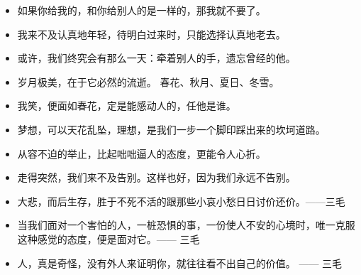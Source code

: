 \documentclass[UTF8,a4paper,8pt]{ctexbook}
\begin{document}
\begin{itemize}
				\item 如果你给我的，和你给别人的是一样的，那我就不要了。
				
				\item 我来不及认真地年轻，待明白过来时，只能选择认真地老去。
				
				\item 或许，我们终究会有那么一天：牵着别人的手，遗忘曾经的他。
				
				\item 岁月极美，在于它必然的流逝。 春花、秋月、夏日、冬雪。
				
				\item 我笑，便面如春花，定是能感动人的，任他是谁。
				
				\item 梦想，可以天花乱坠，理想，是我们一步一个脚印踩出来的坎坷道路。
				
				\item 从容不迫的举止，比起咄咄逼人的态度，更能令人心折。
				
				\item 走得突然，我们来不及告别。这样也好，因为我们永远不告别。
				
				\item 大悲，而后生存，胜于不死不活的跟那些小哀小愁日日讨价还价。——三毛
				
				\item 当我们面对一个害怕的人，一桩恐惧的事，一份使人不安的心境时，唯一克服这种感觉的态度，便是面对它。—— 三毛
				
				\item 人，真是奇怪，没有外人来证明你，就往往看不出自己的价值。 —— 三毛
			\end{itemize}
			
\end{document}
